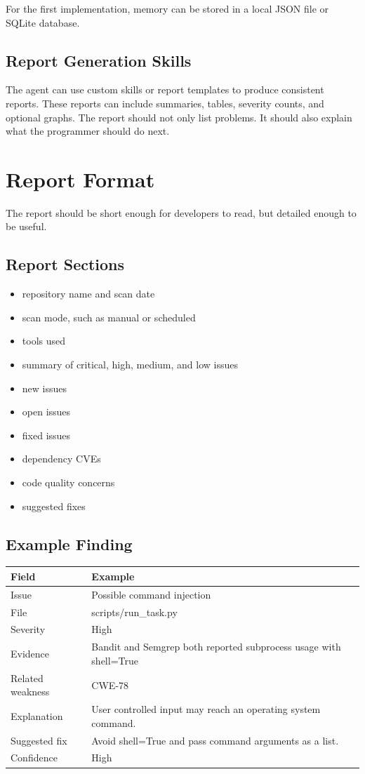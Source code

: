 \documentclass[
    numbers=noenddot,
    parskip=half-,
    fontsize=11pt,
    paper=a4,
    oneside,
    titlepage,
    bibliography=totoc,
    chapterprefix=false
]{scrbook}
\begin{document}
For the first implementation, memory can be stored in a local JSON file or SQLite database.

\section{Report Generation Skills}

The agent can use custom skills or report templates to produce consistent reports. These reports can include summaries, tables, severity counts, and optional graphs. The report should not only list problems. It should also explain what the programmer should do next.

\chapter{Report Format}

The report should be short enough for developers to read, but detailed enough to be useful.

\section{Report Sections}

\begin{itemize}
    \item repository name and scan date
    \item scan mode, such as manual or scheduled
    \item tools used
    \item summary of critical, high, medium, and low issues
    \item new issues
    \item open issues
    \item fixed issues
    \item dependency CVEs
    \item code quality concerns
    \item suggested fixes
\end{itemize}

\section{Example Finding}

\begin{longtable}{p{4cm}p{10cm}}
\toprule
\textbf{Field} & \textbf{Example} \\
\midrule
\endhead
Issue & Possible command injection \\
File & scripts/run\_task.py \\
Severity & High \\
Evidence & Bandit and Semgrep both reported subprocess usage with shell=True \\
Related weakness & CWE-78 \\
Explanation & User controlled input may reach an operating system command. \\
Suggested fix & Avoid shell=True and pass command arguments as a list. \\
Confidence & High \\
\bottomrule
\end{longtable}
\end{document}
